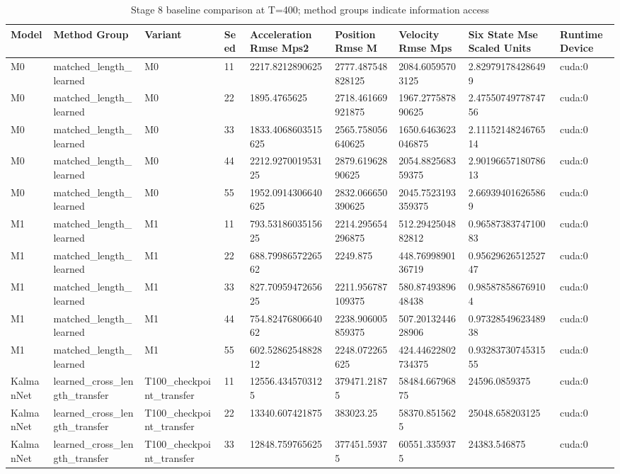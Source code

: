 \begin{table}[t]
\centering
\caption{Stage 8 baseline comparison at T=400; method groups indicate information access}
\label{tab:stage8T400}
\scriptsize
\begin{tabular}{lllllllll}
\hline
Model & Method Group & Variant & Seed & Acceleration Rmse Mps2 & Position Rmse M & Velocity Rmse Mps & Six State Mse Scaled Units & Runtime Device \\
\hline
M0 & matched\_length\_learned & M0 & 11 & 2217.8212890625 & 2777.487548828125 & 2084.60595703125 & 2.829791784286499 & cuda:0 \\
M0 & matched\_length\_learned & M0 & 22 & 1895.4765625 & 2718.461669921875 & 1967.277587890625 & 2.4755074977874756 & cuda:0 \\
M0 & matched\_length\_learned & M0 & 33 & 1833.4068603515625 & 2565.758056640625 & 1650.6463623046875 & 2.1115214824676514 & cuda:0 \\
M0 & matched\_length\_learned & M0 & 44 & 2212.927001953125 & 2879.61962890625 & 2054.882568359375 & 2.9019665718078613 & cuda:0 \\
M0 & matched\_length\_learned & M0 & 55 & 1952.0914306640625 & 2832.066650390625 & 2045.7523193359375 & 2.669394016265869 & cuda:0 \\
M1 & matched\_length\_learned & M1 & 11 & 793.5318603515625 & 2214.295654296875 & 512.2942504882812 & 0.9658738374710083 & cuda:0 \\
M1 & matched\_length\_learned & M1 & 22 & 688.7998657226562 & 2249.875 & 448.7699890136719 & 0.9562962651252747 & cuda:0 \\
M1 & matched\_length\_learned & M1 & 33 & 827.7095947265625 & 2211.956787109375 & 580.8749389648438 & 0.985878586769104 & cuda:0 \\
M1 & matched\_length\_learned & M1 & 44 & 754.8247680664062 & 2238.906005859375 & 507.2013244628906 & 0.9732854962348938 & cuda:0 \\
M1 & matched\_length\_learned & M1 & 55 & 602.5286254882812 & 2248.072265625 & 424.44622802734375 & 0.9328373074531555 & cuda:0 \\
KalmanNet & learned\_cross\_length\_transfer & T100\_checkpoint\_transfer & 11 & 12556.4345703125 & 379471.21875 & 58484.66796875 & 24596.0859375 & cuda:0 \\
KalmanNet & learned\_cross\_length\_transfer & T100\_checkpoint\_transfer & 22 & 13340.607421875 & 383023.25 & 58370.8515625 & 25048.658203125 & cuda:0 \\
KalmanNet & learned\_cross\_length\_transfer & T100\_checkpoint\_transfer & 33 & 12848.759765625 & 377451.59375 & 60551.3359375 & 24383.546875 & cuda:0 \\

\end{tabular}
\end{table}
